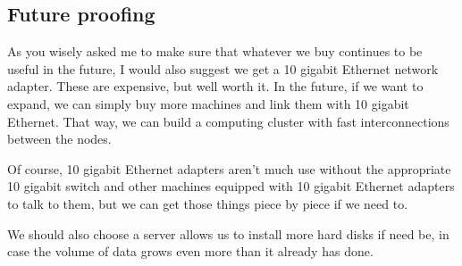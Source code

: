 \documentclass{amsart}
\begin{document}
\subsection{Future proofing}
As you wisely asked me to make sure that whatever we buy continues to be useful in the
future, I would also suggest we get a 10 gigabit Ethernet network adapter. These are
expensive, but well worth it. In the future, if we want to expand, we can simply
buy more machines and link them with 10 gigabit Ethernet. That way, we can build
a computing cluster with fast interconnections between the nodes.

Of course, 10 gigabit Ethernet adapters aren't much use without the appropriate 10 gigabit
switch and other machines equipped with 10 gigabit Ethernet adapters to talk to them, but
we can get those things piece by piece if we need to.

We should also choose a server allows us to install more hard disks if need be, in case the
volume of data grows even more than it already has done.
\end{document}
